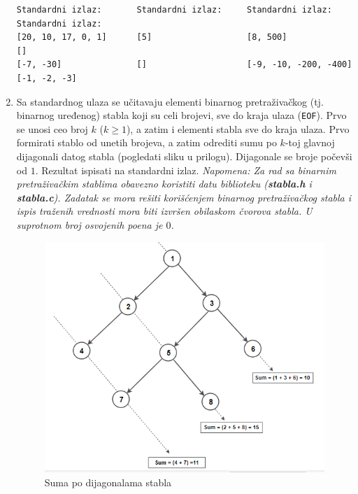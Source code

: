 \begin{enumerate}
\begin{verbatim}
Standardni izlaz:       Standardni izlaz:     Standardni izlaz:           Standardni izlaz:
[20, 10, 17, 0, 1]      [5]                   [8, 500]                    []
[-7, -30]               []                    [-9, -10, -200, -400]       [-1, -2, -3]    
\end{verbatim}  

\item Sa standardnog ulaza se učitavaju elementi binarnog pretraživačkog (tj. binarnog uređenog) stabla koji su celi brojevi, sve do kraja ulaza (\texttt{EOF}). Prvo se unosi ceo broj $k$ ($k \ge 1$), a zatim i elementi stabla sve do kraja ulaza. Prvo formirati stablo od unetih brojeva, a zatim odrediti sumu po $k$-toj glavnoj dijagonali datog stabla (pogledati sliku u prilogu). Dijagonale se broje počevši od $1$. Rezultat ispisati na standardni izlaz.
\textit{Napomena: Za rad sa binarnim pretraživačkim stablima obavezno koristiti datu biblioteku (\textbf{stabla.h} i \textbf{stabla.c}). Zadatak se mora rešiti korišćenjem binarnog pretraživačkog stabla i ispis traženih vrednosti mora biti izvršen obilaskom čvorova stabla. U suprotnom broj osvojenih poena je $0$.}

\begin{figure}[h!]
    \centering
    \begin{minipage}[b]{0.50\textwidth}
        \includegraphics[width=\textwidth]{./Diagonal-Sum-Binary-Tree.png}
        \caption{Suma po dijagonalama stabla}
        \label{fig:slika1}
    \end{minipage}
\end{figure}


\end{enumerate}
